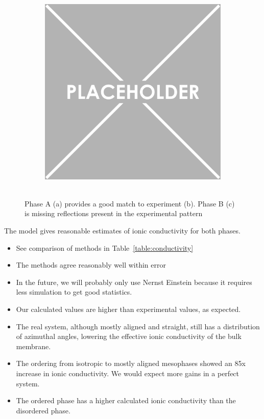\documentclass{article}
\begin{document}
\begin{figure}
\begin{subfigure}{.3\textwidth}
		\caption{~\label{fig:xrdexp}}
	\end{subfigure}
        \begin{subfigure}{.3\textwidth}
                \centering
                \includegraphics[width=\linewidth]{placeholder.png}
                \caption{~\label{fig:xrdB}}
        \end{subfigure}
	\caption{Phase A (a) provides a good match to experiment (b). Phase B (c) is missing reflections present in the experimental pattern} %
	\label{fig:xrd}
	\end{figure}

	The model gives reasonable estimates of ionic conductivity for both phases.
	\begin{itemize}
		\item See comparison of methods in Table~\ref{table:conductivity}
		\item The methods agree reasonably well within error
		\item In the future, we will probably only use Nernst Einstein because it requires less simulation to get good statistics. %
		\item Our calculated values are higher than experimental values, as expected.
		\item The real system, although mostly aligned and straight, still has a distribution of azimuthal angles, lowering the effective ionic conductivity of the bulk membrane. 
		\item The ordering from isotropic to mostly aligned mesophases showed an 85x increase in ionic conductivity. We would expect more gains in a perfect system.
		\item The ordered phase has a higher calculated ionic conductivity than the disordered phase.
	\end{itemize}
	
\end{document}
